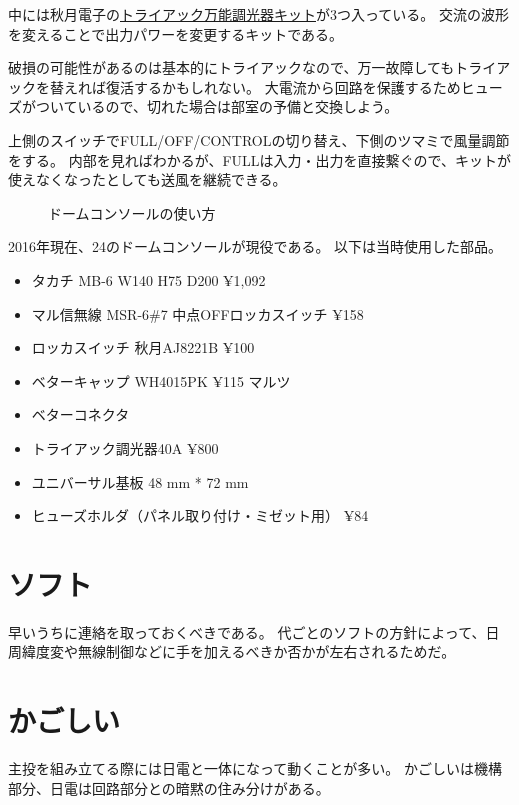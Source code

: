 \documentclass[letterpaper,10pt,dvipdfmx]{sphinxmanual}
\begin{document}
中には秋月電子の\href{http://akizukidenshi.com/catalog/g/gK-00098/}{トライアック万能調光器キット}が3つ入っている。
交流の波形を変えることで出力パワーを変更するキットである。

破損の可能性があるのは基本的にトライアックなので、万一故障してもトライアックを替えれば復活するかもしれない。
大電流から回路を保護するためヒューズがついているので、切れた場合は部室の予備と交換しよう。

上側のスイッチでFULL/OFF/CONTROLの切り替え、下側のツマミで風量調節をする。
内部を見ればわかるが、FULLは入力・出力を直接繋ぐので、キットが使えなくなったとしても送風を継続できる。
\begin{figure}[htbp]
\centering
\capstart

\noindent{}
\caption{ドームコンソールの使い方}\label{\detokenize{syutou:id12}}\end{figure}

2016年現在、24のドームコンソールが現役である。 以下は当時使用した部品。
\begin{itemize}
\item {} 
タカチ MB-6 W140 H75 D200 ¥1,092

\item {} 
マル信無線 MSR-6\#7 中点OFFロッカスイッチ ¥158

\item {} 
ロッカスイッチ 秋月AJ8221B ¥100

\item {} 
ベターキャップ WH4015PK ¥115 マルツ

\item {} 
ベターコネクタ

\item {} 
トライアック調光器40A ¥800

\item {} 
ユニバーサル基板 48 mm * 72 mm

\item {} 
ヒューズホルダ（パネル取り付け・ミゼット用） ¥84

\end{itemize}


\section{ソフト}
\label{\detokenize{syutou:id8}}
早いうちに連絡を取っておくべきである。
代ごとのソフトの方針によって、日周緯度変や無線制御などに手を加えるべきか否かが左右されるためだ。


\section{かごしい}
\label{\detokenize{syutou:id9}}
主投を組み立てる際には日電と一体になって動くことが多い。
かごしいは機構部分、日電は回路部分との暗黙の住み分けがある。
\end{document}

